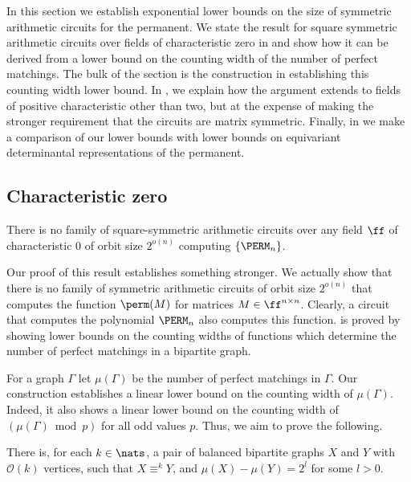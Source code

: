 \documentclass{toc}
\begin{document}
In this section we establish exponential lower bounds on the size of symmetric
arithmetic circuits for the permanent.  We state the result for square
symmetric arithmetic circuits over fields of characteristic zero in
 and show how it can be derived from a
lower bound on the counting width of the number of perfect matchings.
The bulk of the section is the construction in
 establishing this counting width lower
bound.  In ,  we explain how the
argument extends to fields of positive characteristic other than two,
but at the expense of making the stronger requirement that the
circuits are matrix symmetric.  Finally, in
 we make a comparison of our lower bounds
with lower bounds on equivariant determinantal representations of the permanent.

\subsection{Characteristic zero}\label{sec:char-zero}
\begin{theorem}\label{thm:lowerbound-square}
  There is no family of square-symmetric arithmetic circuits over any
  field $\ff$ of
  characteristic $0$ of orbit size $2^{o(n)}$ computing $\{\PERM_n\}$.
\end{theorem}

Our proof of this result establishes something stronger. We actually show that
there is no family of symmetric arithmetic circuits of orbit size $2^{o(n)}$
that computes the function $\perm(M)$ for matrices $M \in \ff^{n \times n}$.
Clearly, a circuit that computes the polynomial $\PERM_n$ also computes this
function.  is proved by showing lower bounds on the
counting widths of functions which determine the number of perfect matchings in
a bipartite graph.

For a graph $\Gamma$ let $\mu(\Gamma)$ be the number of perfect matchings in $\Gamma$.  Our construction establishes a linear lower bound on the counting width of $\mu(\Gamma)$.  Indeed, it also shows a linear lower bound on the counting width of $(\mu(\Gamma) \bmod p)$
for all odd values $p$.
Thus, we aim to prove the following.

\begin{theorem}\label{thm:matching}
  There is, for each $k \in \nats$, a pair of balanced bipartite graphs $X$ and
  $Y$ with $\mathcal{O}(k)$ vertices, such that $X \equiv^k Y$, and $\mu(X) -
  \mu(Y) = 2^l$ for some $l >0$.
\end{theorem}
\end{document}
